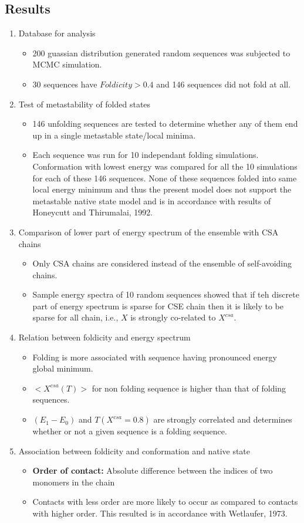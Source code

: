 \documentclass[12pt]{article}
\theoremstyle{definition}
\theoremstyle{remark}
\begin{document}
\subsection{Results}
\begin{enumerate}
\item Database for analysis
	\begin{itemize}
	\item 200 guassian distribution generated random sequences was subjected to MCMC simulation.
	\item 30 sequences have $Foldicity > 0.4$ and 146 sequences did not fold at all.
	\end{itemize}
\item Test of metastability of folded states
	\begin{itemize}
	\item 146 unfolding sequences are tested to determine whether any of them end up in a single metastable state/local minima.
	\item Each sequence was run for 10 independant folding simulations. Conformation with lowest energy was compared for all the 10 simulations for each of these 146 sequences. None of these sequences folded into same local energy minimum and thus the present model does not support the metastable native state model and is in accordance with results of Honeycutt and Thirumalai, 1992.
	\end{itemize}
\item Comparison of lower part of energy spectrum of the ensemble with CSA chains
	\begin{itemize}
	\item Only CSA chains are considered instead of the ensemble of self-avoiding chains.
	\item Sample energy spectra of 10 random sequences showed that if teh discrete part of energy spectrum is sparse for CSE chain then it is likely to be sparse for all chain, i.e., $X$ is strongly co-related to $X^{csa}$.
	\end{itemize}
\item Relation between foldicity and energy spectrum
	\begin{itemize}
	\item Folding is more associated with sequence having pronounced energy global minimum.
	\item $<X^{csa}(T)>$ for non folding sequence is higher than that of folding sequences.
	\item $(E_1 - E_0)$ and $T(X^{csa}=0.8)$ are strongly correlated and determines whether or not a given sequence is a folding sequence.
	\end{itemize}
\item Association between foldicity and conformation and native state
	\begin{itemize}
	\item \textbf{Order of contact:} Absolute difference between the indices of two monomers in the chain
	\item Contacts with less order are more likely to occur as compared to contacts with higher order. This resulted is in accordance with Wetlaufer, 1973.
	\end{itemize}
\end{enumerate}
\end{document}

